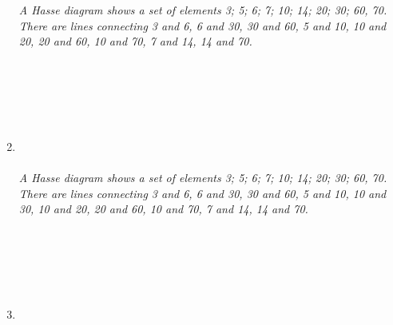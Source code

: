 \documentclass{amsart}
\theoremstyle{definition}
\theoremstyle{Exercise}
\theoremstyle{remark}
\theoremstyle{rule}
\numberwithin{equation}{section}
\begin{document}
\begin{enumerate}[label=(\alph*)]
{}
\\\\
{\color{blue}{\bf Figure 2:} \emph{A Hasse diagram shows a set of elements {3; 5; 6; 7; 10; 14; 20; 30; 60, 70}. There are lines connecting 3 and 6, 6 and 30, 30 and 60, 5 and 10, 10 and 20, 20 and 60, 10 and 70, 7 and 14, 14 and 70.
}
}
\\
\\
\\\\
\newpage
~\\~\\
\item
{}
\\\\
{\color{blue}{\bf Figure 3:} \emph{A Hasse diagram shows a set of elements {3; 5; 6; 7; 10; 14; 20; 30; 60, 70}. There are lines connecting 3 and 6, 6 and 30, 30 and 60, 5 and 10, 10 and 30, 10 and 20, 20 and 60, 10 and 70, 7 and 14, 14 and 70.
}
}
\\
\\
\\\\
\newpage
~\\~\\
\item
{}
\end{enumerate}
\end{document}
